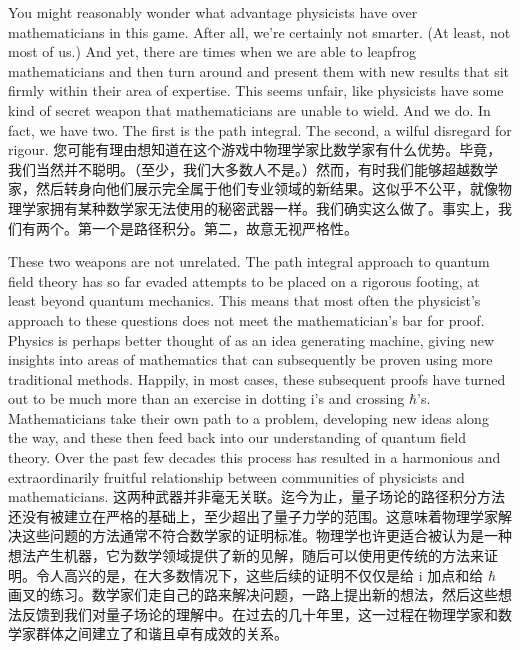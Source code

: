 \documentclass{ctexart}
\begin{document}
\begin{paracol}{2}
You might reasonably wonder what advantage physicists have over mathematicians in this game. After all, we're certainly not smarter. (At least, not most of us.) And yet, there are times when we are able to leapfrog mathematicians and then turn around and present them with new results that sit firmly within their area of expertise. This seems unfair, like physicists have some kind of secret weapon that mathematicians are unable to wield. And we do. In fact, we have two. The first is the path integral. The second, a wilful disregard for rigour.
\switchcolumn
您可能有理由想知道在这个游戏中物理学家比数学家有什么优势。毕竟，我们当然并不聪明。（至少，我们大多数人不是。）然而，有时我们能够超越数学家，然后转身向他们展示完全属于他们专业领域的新结果。这似乎不公平，就像物理学家拥有某种数学家无法使用的秘密武器一样。我们确实这么做了。事实上，我们有两个。第一个是路径积分。第二，故意无视严格性。
\switchcolumn*

These two weapons are not unrelated. The path integral approach to quantum field theory has so far evaded attempts to be placed on a rigorous footing, at least beyond quantum mechanics. This means that most often the physicist's approach to these questions does not meet the mathematician's bar for proof. Physics is perhaps better thought of as an idea generating machine, giving new insights into areas of mathematics that can subsequently be proven using more traditional methods. Happily, in most cases, these subsequent proofs have turned out to be much more than an exercise in dotting i's and crossing $\hbar$'s. Mathematicians take their own path to a problem, developing new ideas along the way, and these then feed back into our understanding of quantum field theory. Over the past few decades this process has resulted in a harmonious and extraordinarily fruitful relationship between communities of physicists and mathematicians.
\switchcolumn
这两种武器并非毫无关联。迄今为止，量子场论的路径积分方法还没有被建立在严格的基础上，至少超出了量子力学的范围。这意味着物理学家解决这些问题的方法通常不符合数学家的证明标准。物理学也许更适合被认为是一种想法产生机器，它为数学领域提供了新的见解，随后可以使用更传统的方法来证明。令人高兴的是，在大多数情况下，这些后续的证明不仅仅是给 i 加点和给 $\hbar$ 画叉的练习。数学家们走自己的路来解决问题，一路上提出新的想法，然后这些想法反馈到我们对量子场论的理解中。在过去的几十年里，这一过程在物理学家和数学家群体之间建立了和谐且卓有成效的关系。
\switchcolumn*


\end{paracol}
\end{document}
